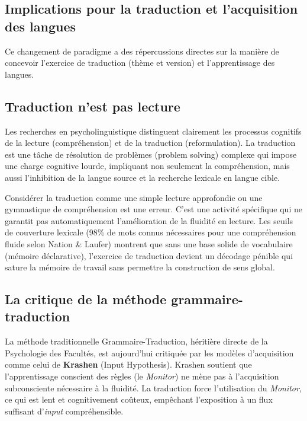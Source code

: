 \subsection{Implications pour la traduction et l'acquisition des langues}

Ce changement de paradigme a des répercussions directes sur la manière de concevoir l'exercice de
traduction (thème et version) et l'apprentissage des langues.



\subsection{Traduction n'est pas lecture}

Les recherches en psycholinguistique distinguent clairement les processus cognitifs de la lecture
(compréhension) et de la traduction (reformulation). La traduction est une tâche de résolution de
problèmes (problem solving) complexe qui impose une charge cognitive lourde, impliquant non
seulement la compréhension, mais aussi l'inhibition de la langue source et la recherche lexicale en
langue cible.\cite{II-1-1-ref43}

Considérer la traduction comme une simple \og lecture approfondie\fg{} ou une gymnastique de
compréhension est une erreur. C'est une activité spécifique qui ne garantit pas automatiquement
l'amélioration de la fluidité en lecture. Les seuils de couverture lexicale (98\% de mots connus
nécessaires pour une compréhension fluide selon Nation \& Laufer) montrent que sans une base solide
de vocabulaire (mémoire déclarative), l'exercice de traduction devient un décodage pénible qui
sature la mémoire de travail sans permettre la construction de sens global.\cite{II-1-1-ref46}



\subsection{La critique de la méthode grammaire-traduction}

La méthode traditionnelle Grammaire-Traduction, héritière directe de la Psychologie des Facultés,
est aujourd'hui critiquée par les modèles d'acquisition comme celui de \textbf{Krashen} (Input
Hypothesis). Krashen soutient que l'apprentissage conscient des règles (le \textit{Monitor}) ne mène
pas à l'acquisition subconsciente nécessaire à la fluidité. La traduction force l'utilisation du
\textit{Monitor}, ce qui est lent et cognitivement coûteux, empêchant l'exposition à un flux
suffisant d'\textit{input} compréhensible.\cite{II-1-1-ref49}



